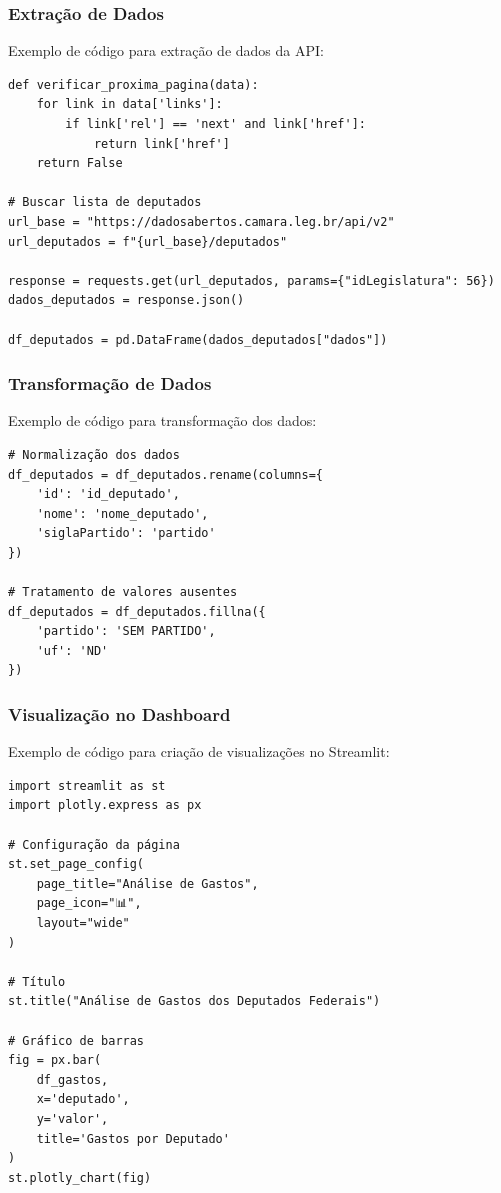 \documentclass[12pt,a4paper]{article}
\begin{document}
\subsubsection{Extração de Dados}
Exemplo de código para extração de dados da API:

\begin{lstlisting}
def verificar_proxima_pagina(data):
    for link in data['links']:
        if link['rel'] == 'next' and link['href']:
            return link['href']
    return False

# Buscar lista de deputados
url_base = "https://dadosabertos.camara.leg.br/api/v2"
url_deputados = f"{url_base}/deputados"

response = requests.get(url_deputados, params={"idLegislatura": 56})
dados_deputados = response.json()

df_deputados = pd.DataFrame(dados_deputados["dados"])
\end{lstlisting}

\subsubsection{Transformação de Dados}
Exemplo de código para transformação dos dados:

\begin{lstlisting}
# Normalização dos dados
df_deputados = df_deputados.rename(columns={
    'id': 'id_deputado',
    'nome': 'nome_deputado',
    'siglaPartido': 'partido'
})

# Tratamento de valores ausentes
df_deputados = df_deputados.fillna({
    'partido': 'SEM PARTIDO',
    'uf': 'ND'
})
\end{lstlisting}

\subsubsection{Visualização no Dashboard}
Exemplo de código para criação de visualizações no Streamlit:

\begin{lstlisting}
import streamlit as st
import plotly.express as px

# Configuração da página
st.set_page_config(
    page_title="Análise de Gastos",
    page_icon="📊",
    layout="wide"
)

# Título
st.title("Análise de Gastos dos Deputados Federais")

# Gráfico de barras
fig = px.bar(
    df_gastos,
    x='deputado',
    y='valor',
    title='Gastos por Deputado'
)
st.plotly_chart(fig)
\end{lstlisting}
\end{document}
